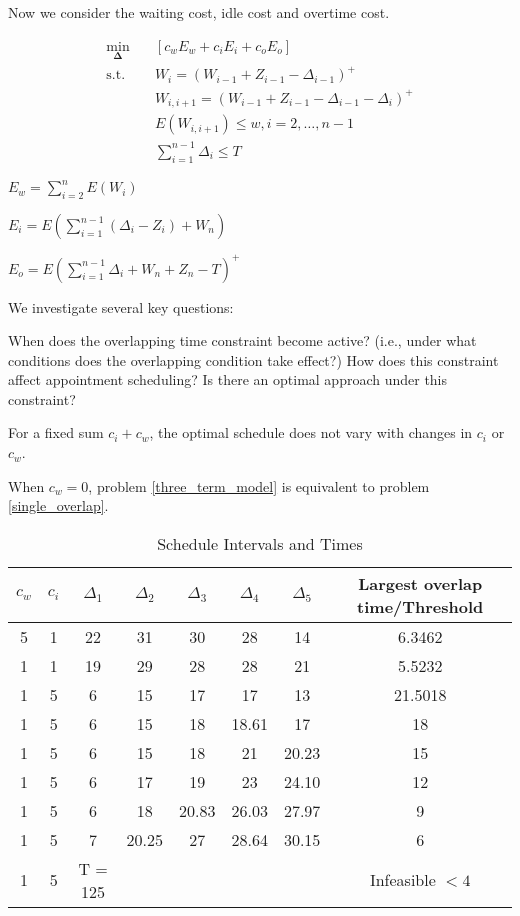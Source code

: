 \documentclass{article}
\newcommand{\D}{\bm{\Delta}}
\begin{document}

Now we consider the waiting cost, idle cost and overtime cost.

\begin{equation}
    \label{three_term_model}
    \begin{aligned}
        \min_{\D} \quad & \left[c_{w} E_{w} + c_{i} E_{i} + c_{o} E_{o} \right] \\
        \mbox{s.t.} \quad & W_{i} = (W_{i-1} + Z_{i-1} - \Delta_{i-1})^{+} \\
        & W_{i, i+1} = (W_{i-1} + Z_{i-1} - \Delta_{i-1}- \Delta_{i})^{+} \\
        & E(W_{i,i+1}) \leq w, i = 2, \ldots, n-1  \\
        & \sum_{i=1}^{n-1} \Delta_{i} \leq T
    \end{aligned}
\end{equation}

$E_{w} = \sum_{i=2}^{n} E(W_{i})$

$E_{i} = E(\sum_{i=1}^{n-1} (\Delta_{i} -Z_{i}) + W_{n})$

$E_{o} = E(\sum_{i=1}^{n-1}\Delta_{i} + W_{n}+ Z_{n} - T)^{+}$


We investigate several key questions:

When does the overlapping time constraint become active? (i.e., under what conditions does the overlapping condition take effect?) How does this constraint affect appointment scheduling? Is there an optimal approach under this constraint?


For a fixed sum $c_{i} + c_{w}$, the optimal schedule does not vary with changes in $c_{i}$ or $c_{w}$.

When $c_{w} = 0$, problem \eqref{three_term_model} is equivalent to problem \eqref{single_overlap}.

\begin{table}[ht]
    \centering
    \caption{Schedule Intervals and Times}
    \begin{tabular}{cccccccc}
    \hline
    \hline
    $c_{w}$ & $c_{i}$ & $\Delta_1$ & $\Delta_2$ & $\Delta_3$ & $\Delta_4$ & $\Delta_5$ & Largest overlap time/Threshold  \\
    \hline
    5  &  1  & 22 & 31 & 30 & 28 & 14 & 6.3462 \\
    \hline
    1  &  1  & 19 & 29 & 28 & 28 & 21 & 5.5232 \\
    \hline
    1  &  5  &  6 & 15 & 17 & 17 & 13 & 21.5018  \\
    1  &  5  &  6 & 15 & 18 & 18.61 & 17 & 18 \\
    1  &  5  & 6 & 15  & 18 & 21 & 20.23 & 15 \\
    1  &  5  & 6 & 17  & 19 & 23 & 24.10 & 12 \\
    1  &  5  & 6 & 18  & 20.83 & 26.03 & 27.97 & 9 \\
    1  &  5  & 7 & 20.25  & 27 & 28.64 & 30.15 & 6 \\
    1  &  5  & T = 125 &  &    &       &       &  Infeasible  $< 4$ \\
    \hline
    \end{tabular}
  \end{table}
\end{document}
